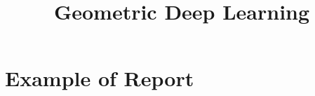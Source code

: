 \documentclass[a4paper,14pt]{article}
\title{Geometric Deep Learning}
\date{}
\numberwithin{equation}{section}
\begin{document}
    \maketitle
    \tableofcontents
    
    \clearpage
    \section{Example of Report} %
    {} %
    

    \clearpage
    \printbibliography
\end{document}

